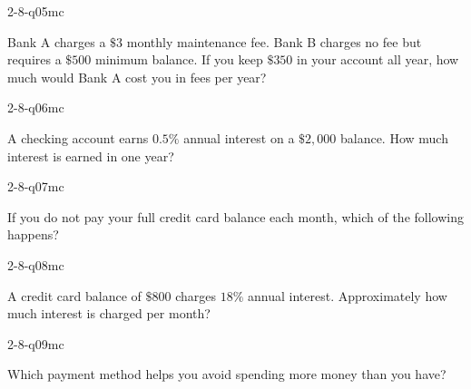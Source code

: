 \begin{practiceQuestion}{2-8-q05}{mc}
\begin{questionText}
Bank A charges a $\$3$ monthly maintenance fee. Bank B charges no fee but requires a $\$500$ minimum balance. If you keep $\$350$ in your account all year, how much would Bank A cost you in fees per year?
\end{questionText}
\end{practiceQuestion}

\begin{practiceQuestion}{2-8-q06}{mc}
\begin{questionText}
A checking account earns $0.5\%$ annual interest on a $\$2{,}000$ balance. How much interest is earned in one year?
\end{questionText}
\end{practiceQuestion}

\begin{practiceQuestion}{2-8-q07}{mc}
\begin{questionText}
If you do not pay your full credit card balance each month, which of the following happens?
\end{questionText}
\end{practiceQuestion}

\begin{practiceQuestion}{2-8-q08}{mc}
\begin{questionText}
A credit card balance of $\$800$ charges $18\%$ annual interest. Approximately how much interest is charged per month?
\end{questionText}
\end{practiceQuestion}

\begin{practiceQuestion}{2-8-q09}{mc}
\begin{questionText}
Which payment method helps you avoid spending more money than you have?
\end{questionText}
\end{practiceQuestion}

